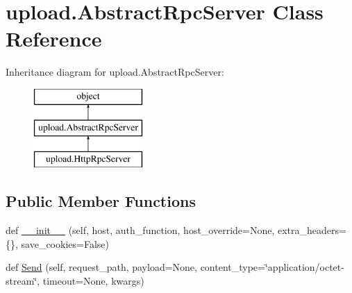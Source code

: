 \hypertarget{classupload_1_1_abstract_rpc_server}{}\section{upload.\+Abstract\+Rpc\+Server Class Reference}
\label{classupload_1_1_abstract_rpc_server}
Inheritance diagram for upload.\+Abstract\+Rpc\+Server\+:\begin{figure}[H]
\begin{center}
\leavevmode
\includegraphics[height=3.000000cm]{classupload_1_1_abstract_rpc_server}
\end{center}
\end{figure}
\subsection*{Public Member Functions}
\begin{DoxyCompactItemize}
\item 
def \mbox{\hyperlink{classupload_1_1_abstract_rpc_server_a3f6bc1bd16b52bd5a5c33a1fedeef2d0}{\+\_\+\+\_\+init\+\_\+\+\_\+}} (self, host, auth\+\_\+function, host\+\_\+override=None, extra\+\_\+headers=\{\}, save\+\_\+cookies=False)
\item 
def \mbox{\hyperlink{classupload_1_1_abstract_rpc_server_ac1b913f8bd00da4741c47ab49ea94cb5}{Send}} (self, request\+\_\+path, payload=None, content\+\_\+type=\char`\"{}application/octet-\/stream\char`\"{}, timeout=None, kwargs)
\end{DoxyCompactItemize}
